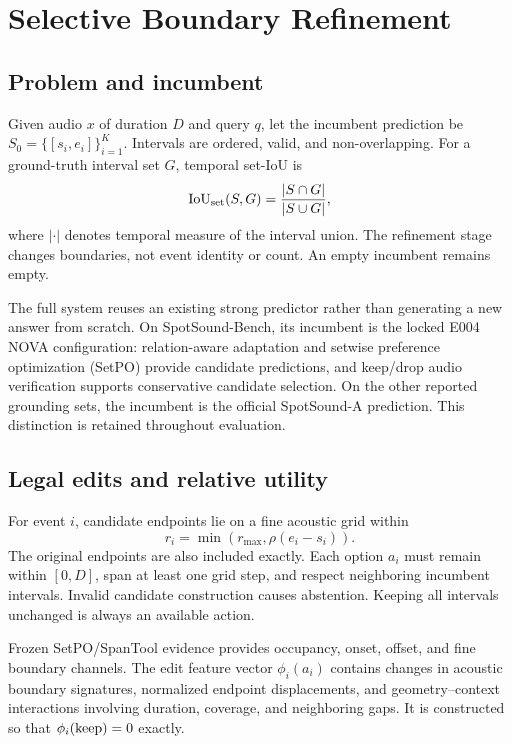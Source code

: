 \section{Selective Boundary Refinement}
\label{sec:method}
\subsection{Problem and incumbent}
Given audio $x$ of duration $D$ and query $q$, let the incumbent prediction be $S_0=\{[s_i,e_i]\}_{i=1}^{K}$. Intervals are ordered, valid, and non-overlapping. For a ground-truth interval set $G$, temporal set-IoU is
\begin{equation}
\operatorname{IoU}_{\mathrm{set}}(S,G)=\frac{|S\cap G|}{|S\cup G|},
\label{eq:iou}
\end{equation}
where $|\cdot|$ denotes temporal measure of the interval union. The refinement stage changes boundaries, not event identity or count. An empty incumbent remains empty.

The full system reuses an existing strong predictor rather than generating a new answer from scratch. On SpotSound-Bench, its incumbent is the locked E004 NOVA configuration: relation-aware adaptation and setwise preference optimization (SetPO) provide candidate predictions, and keep/drop audio verification supports conservative candidate selection. On the other reported grounding sets, the incumbent is the official SpotSound-A prediction. This distinction is retained throughout evaluation.

\subsection{Legal edits and relative utility}
For event $i$, candidate endpoints lie on a fine acoustic grid within
\begin{equation}
r_i=\min(r_{\max},\rho(e_i-s_i)).
\label{eq:radius}
\end{equation}
The original endpoints are also included exactly. Each option $a_i$ must remain within $[0,D]$, span at least one grid step, and respect neighboring incumbent intervals. Invalid candidate construction causes abstention. Keeping all intervals unchanged is always an available action.

Frozen SetPO/SpanTool evidence provides occupancy, onset, offset, and fine boundary channels. The edit feature vector $\phi_i(a_i)$ contains changes in acoustic boundary signatures, normalized endpoint displacements, and geometry--context interactions involving duration, coverage, and neighboring gaps. It is constructed so that $\phi_i(\mathrm{keep})=0$ exactly.

